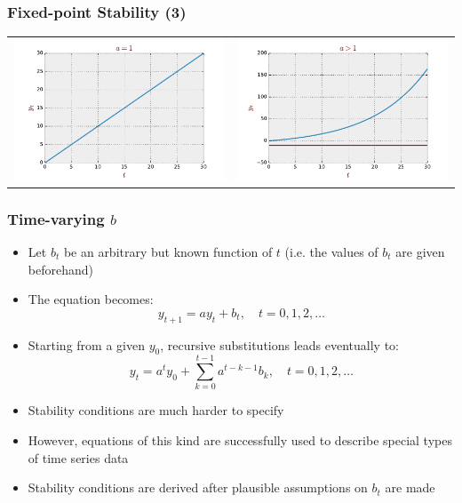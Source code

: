 \documentclass[10pt,usenames,dvipsnames]{beamer}
\theoremstyle{definition}
\begin{document}
\begin{frame}[fragile]
\frametitle{Fixed-point Stability (3)}
\begin{center}
	\begin{tabular}{cc}
		\includegraphics[scale=0.3]{./figs/fig5} & \includegraphics[scale=0.3]{./figs/fig6}
\end{tabular}

\end{center}
\end{frame}

\begin{frame}[fragile]
\frametitle{Time-varying $b$}
\begin{itemize}
	\item Let $b_{t}$ be an arbitrary but known function of $t$ (i.e. the values of $b_{t}$ are given beforehand)
	\item The equation becomes:
	\[
		y_{t+1} = ay_{t} + b_{t}, \quad t = 0,1,2,\ldots
	\]
	\item Starting from a given $y_{0}$, recursive substitutions leads eventually to:
	\[
		y_{t} = a^{t}y_{0} + \sum_{k=0}^{t-1}a^{t-k-1}b_{k}, \quad t = 0,1,2,\ldots
	\]
	\item Stability conditions are much harder to specify
	\item However, equations of this kind are successfully used to describe special types of time series data
	\item Stability conditions are derived after plausible assumptions on $b_{t}$ are made
\end{itemize}
\end{frame}
\end{document}
